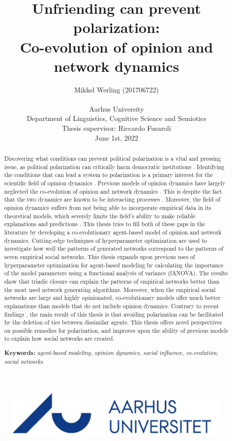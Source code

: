 \documentclass[11pt]{article}
\title{Unfriending can prevent polarization: 
\Large \\Co-evolution of opinion and network dynamics}
\author{Mikkel Werling (201706722) \\ \\ \small Aarhus University \\ \small Department of Linguistics, Cognitive Science and Semiotics \\ \small Thesis supervisor: Riccardo Fusaroli \\ \small June 1st, 2022 \\}
\date{}
\begin{document}
\maketitle
\thispagestyle{empty}
\vspace{10mm}
\begin{centering}
\begin{figure}[H]
    \centering
    \includegraphics[width=.3\linewidth]{../plots/references/aulogo_dk_var2_blaa.png}
\end{figure}
\end{centering}


\newpage
\begin{abstract}
  \noindent Discovering what conditions can prevent political polarization is a vital and pressing issue, as political polarization can critically harm democratic institutions \cite{boxell_cross-country_2020, levin_dynamics_2021}. Identifying the conditions that can lead a system to polarization is a primary interest for the scientific field of opinion dynamics \cite{flache_models_2017}. Previous models of opinion dynamics have largely neglected the co-evolution of opinion and network dynamics \cite{flache_models_2017, galesic_integrating_2021}. This is despite the fact that the two dynamics are known to be interacting processes \cite{bener_empirical_2016, mcpherson_birds_2001, kossinets_origins_2009}.
  Moreover, the field of opinion dynamics suffers from not being able to incorporate empirical data in its theoretical models, which severely limits the field's ability to make reliable explanations and predictions \cite{flache_models_2017,galesic_integrating_2021, mas2019challenges}.
  This thesis tries to fill both of these gaps in the literature by developing a co-evolutionary agent-based model of opinion and network dynamics. Cutting-edge techniques of hyperparameter optimization are used to investigate how well the patterns of generated networks correspond to the patterns of seven empirical social networks. This thesis expands upon previous uses of hyperparameter optimization for agent-based modeling by calculating the importance of the model parameters using a functional analysis of variance (fANOVA).
  The results show that triadic closure can explain the patterns of empirical networks better than the most used network generating algorithms. Moreover, when the empirical social networks are large and highly opinionated, co-evolutionary models offer much better explanations than models that do not include opinion dynamics.
  Contrary to recent findings \cite{sasahara_social_2021}, the main result of this thesis is that avoiding polarization can be facilitated by the deletion of ties between dissimilar agents. This thesis offers novel perspectives on possible remedies for polarization, and improves upon the ability of previous models to explain how social networks are created. 
  
  \centering
  \vspace{3mm}
  \noindent \textbf{Keywords:} \textit{agent-based modeling, opinion dynamics, social influence, co-evolution, social networks}
\end{abstract}
\end{document}
